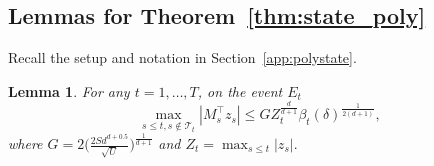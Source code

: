 \documentclass[11pt]{article}
\theoremstyle{plain}
\newtheorem{lem}[thm]{Lemma}
\theoremstyle{definition}
\theoremstyle{remark}
\begin{document}
\subsection{Lemmas for Theorem~\ref{thm:state_poly}}

Recall the setup and notation in Section~\ref{app:polystate}.

\begin{lem}\label{lem:abbasi_lem_18}
For any $t = 1, \ldots, T$, on the event $E_t$
\begin{equation*}
\max_{s\leq t,s\notin \mathcal{T}_t} |M_s^\top z_s| \leq GZ_t^{\frac{d}{d+1}} \beta_t(\delta)^{\frac{1}{2(d+1)}},
\end{equation*}
where $G=2\big(\frac{2Sd^{d+0.5}}{\sqrt{U}}\big)^{\frac{1}{d+1}}$ and $Z_t=\max_{s\leq t}|z_s|.$
\end{lem}
\end{document}
